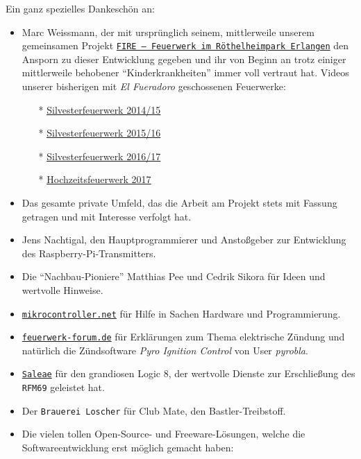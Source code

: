 \documentclass[paper=a4, parskip, numbers=noenddot, toc=listof, headsepline]{scrbook}
\newcommand{\pic}{\emph{Pyro Ignition Control}}
\newcommand{\anlage}{\emph{El Fueradoro}}
\begin{document}
			Ein ganz spezielles Dankeschön an:
			\begin{itemize}
				\item Marc Weissmann, der mit ursprünglich seinem, mittlerweile unserem gemeinsamen Projekt \href{http://www.facebook.com/FIREErlangen}{\texttt{FIRE~-- Feuerwerk im Röthel\-heim\-park Er\-langen}} den Ansporn zu dieser Entwicklung gegeben und ihr von Beginn an trotz einiger mittlerweile behobener \enquote{Kinderkrankheiten} immer voll vertraut hat. Videos unserer bisherigen mit {\anlage} geschossenen Feuerwerke:
				      \begin{itemize}
					      \item[*] \underline{\href{https://vimeo.com/116115628}{Silvesterfeuerwerk 2014/15}}
					      \item[*] \underline{\href{https://vimeo.com/150594996}{Silvesterfeuerwerk 2015/16}}
					      \item[*] \underline{\href{https://vimeo.com/198168273}{Silvesterfeuerwerk 2016/17}}
					      \item[*] \underline{\href{https://www.youtube.com/watch?v=uPTW1dpsVoU}{Hochzeitsfeuerwerk 2017}}
				      \end{itemize}
				\item Das gesamte private Umfeld, das die Arbeit am Projekt stets mit Fassung getragen und mit Interesse verfolgt hat.
				\item Jens Nachtigal, den Hauptprogrammierer und Anstoßgeber zur Entwicklung des Raspberry-Pi-Transmitters.
				\item Die \enquote{Nachbau-Pioniere} Matthias Pee und Cedrik Sikora für Ideen und wertvolle Hinweise.
				\item \href{http://www.mikrocontroller.net}{\texttt{mikrocontroller.net}} für Hilfe in Sachen Hardware und Programmierung.
				\item \href{http://www.feuerwerk-forum.de}{\texttt{feuerwerk-forum.de}} für Erklärungen zum Thema elektrische Zündung und natürlich die Zündsoftware {\pic} von User \emph{pyrobla}.
				\item \href{http://www.saleae.com}{\texttt{Saleae}} für den grandiosen Logic 8, der wertvolle Dienste zur Erschließung des \texttt{RFM69} geleistet hat.
				\item Der \texttt{Brauerei Loscher} für Club Mate, den Bastler-Treibstoff.
				\item Die vielen tollen Open-Source- und Freeware-Lösungen, welche die Softwareentwicklung erst möglich gemacht haben:
				      \begin{itemize}

\end{itemize}
\end{itemize}
\end{document}
